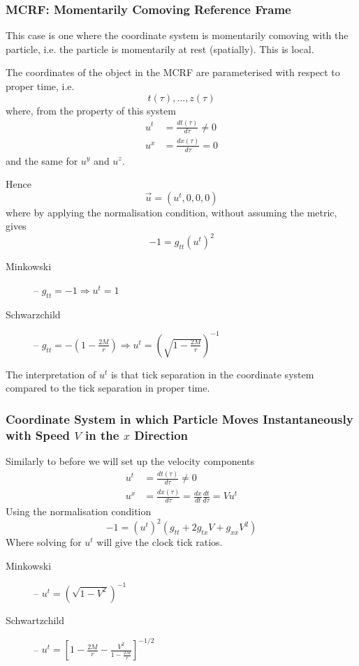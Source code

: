 \subsubsection{MCRF: Momentarily Comoving Reference Frame}
This case is one where the coordinate system is momentarily comoving with the particle, i.e. the particle is momentarily at rest (spatially). This is local. \par
The coordinates of the object in the MCRF are parameterised with respect to proper time, i.e.
$$ t(\tau), \dots, z(\tau) $$
where, from the property of this system
\begin{align*}
    u^t & = \frac{dt(\tau)}{d\tau} \neq 0 \\
    u^x & = \frac{dx(\tau)}{d\tau} = 0
\end{align*}
and the same for $u^y$ and $u^z$. \par Hence 
$$ \vec{u} = (u^t, 0, 0, 0) $$
where by applying the normalisation condition, without assuming the metric, gives
$$ -1 = g_{tt} (u^t)^2 $$
\begin{description}
    \item[Minkowski] -- $g_{tt} = -1 \Rightarrow u^t = 1$
    \item[Schwarzchild] -- $g_{tt} = - \left( 1 - \frac{2M}{r}\right) \Rightarrow u^t = \left(\sqrt{1 - \frac{2M}{r}}\right)^{-1} $
\end{description}
The interpretation of $u^t$ is that tick separation in the coordinate system compared to the tick separation in proper time.

\subsubsection{Coordinate System in which Particle Moves Instantaneously with Speed $V$ in the $x$ Direction}
Similarly to before we will set up the velocity components
\begin{align*}
    u^t & = \frac{dt(\tau)}{d\tau} \neq 0 \\
    u^x & = \frac{dx(\tau)}{d\tau} = \frac{dx}{dt}\frac{dt}{d\tau} = Vu^t
\end{align*}
Using the normalisation condition
$$ -1 = (u^t)^2 \left(g_{tt} + 2g_{tx} V + g_{xx} V^2 \right) $$
Where solving for $u^t$ will give the clock tick ratios.
\begin{description}
    \item[Minkowski] -- $u^t = \left(\sqrt{1-V^2}\right)^{-1}$ 
    \item[Schwartzchild] -- $u^t = \left[1 - \frac{2M}{r} - \frac{V^2}{1- \frac{2M}{r}} \right]^{-1/2}$
\end{description}

